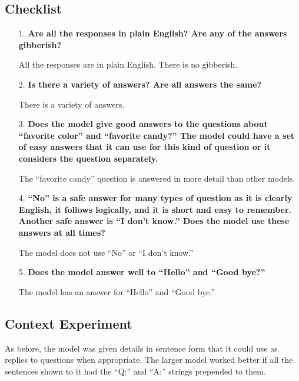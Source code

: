 \subsection{Checklist}

\begin{itemize}
	\item [1.] \textbf{Are all the responses in plain English? Are any of the answers gibberish?}
	
	\item []All the responses are in plain English. There is no gibberish.
	
	\item [2.] \textbf{Is there a  variety of answers? Are all answers the same?}
	
	\item []There is a variety of answers. 
	
	\item [3.] \textbf{Does the model give good answers to the questions about ``favorite color'' and ``favorite candy?'' The model could have a set of easy answers that it can use for this kind of question or it considers the question separately.} 
	
	\item []The ``favorite candy'' question is answered in more detail than other models.
	
	\item [4.] \textbf{``No'' is a safe answer for many types of question as it is clearly English, it follows logically, and it is short and easy to remember. Another safe answer is ``I don't know.'' Does the model use these answers at all times?}
	
	\item []The model does not use ``No'' or ``I don't know.''
	
	\item [5.] \textbf{Does the model answer well to ``Hello'' and ``Good bye?''}
	
	\item []The model has an answer for ``Hello'' and ``Good bye.''
	
\end{itemize}


\subsection{Context Experiment}

As before, the model was given details in sentence form that it could use as replies to questions when appropriate. The larger model worked better if all the sentences shown to it had the ``Q:'' and ``A:'' strings prepended to them. 

